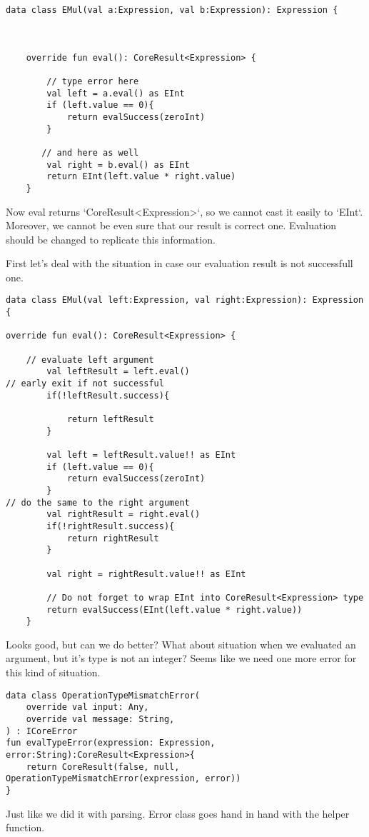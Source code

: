 \documentclass[11pt]{article}
\begin{document}
\begin{verbatim}
data class EMul(val a:Expression, val b:Expression): Expression {



    override fun eval(): CoreResult<Expression> {

        // type error here
        val left = a.eval() as EInt
        if (left.value == 0){
            return evalSuccess(zeroInt)
        }

       // and here as well
        val right = b.eval() as EInt
        return EInt(left.value * right.value)
    }
\end{verbatim}

Now eval returns `CoreResult<Expression>`, so we cannot cast it easily to `EInt`.
Moreover, we cannot be even sure that our result is correct one.
Evaluation should be changed to replicate this information.

First let's deal with the situation in case our evaluation result is not successfull one.
\begin{verbatim}
data class EMul(val left:Expression, val right:Expression): Expression {

override fun eval(): CoreResult<Expression> {

    // evaluate left argument
        val leftResult = left.eval()
// early exit if not successful
        if(!leftResult.success){

            return leftResult
        }

        val left = leftResult.value!! as EInt
        if (left.value == 0){
            return evalSuccess(zeroInt)
        }
// do the same to the right argument
        val rightResult = right.eval()
        if(!rightResult.success){
            return rightResult
        }

        val right = rightResult.value!! as EInt

        // Do not forget to wrap EInt into CoreResult<Expression> type
        return evalSuccess(EInt(left.value * right.value))
    }
\end{verbatim}

Looks good, but can we do better?
What about situation when we evaluated an argument, but it's type is not an integer?
Seems like we need one more error for this kind of situation.

\begin{verbatim}
data class OperationTypeMismatchError(
    override val input: Any,
    override val message: String,
) : ICoreError
fun evalTypeError(expression: Expression, error:String):CoreResult<Expression>{
    return CoreResult(false, null, OperationTypeMismatchError(expression, error))
}

\end{verbatim}
Just like we did it with parsing. Error class goes hand in hand with the helper function.
\end{document}
